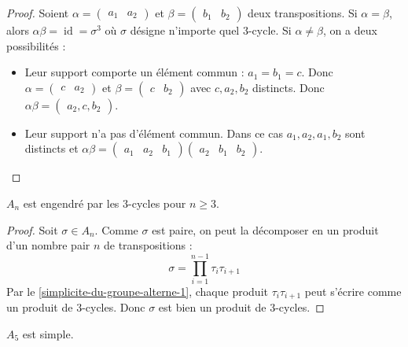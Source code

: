   \begin{proof}
    Soient $\alpha = \begin{pmatrix} a_1 & a_2 \end{pmatrix}$ et $\beta = \begin{pmatrix} b_1 & b_2 \end{pmatrix}$ deux transpositions. Si $\alpha = \beta$, alors $\alpha\beta = \operatorname{id} = \sigma^3$ où $\sigma$ désigne n'importe quel $3$-cycle.
    \newpar
    Si $\alpha \neq \beta$, on a deux possibilités :
    \begin{itemize}
      \item Leur support comporte un élément commun : $a_1 = b_1 = c$. Donc $\alpha = \begin{pmatrix} c & a_2 \end{pmatrix}$ et $\beta = \begin{pmatrix} c & b_2 \end{pmatrix}$ avec $c, a_2, b_2$ distincts. Donc $\alpha\beta = \begin{pmatrix} a_2, c, b_2 \end{pmatrix}$.
      \item Leur support n'a pas d'élément commun. Dans ce cas $a_1, a_2, a_1, b_2$ sont distincts et $\alpha\beta = \begin{pmatrix} a_1 & a_2 & b_1 \end{pmatrix} \begin{pmatrix} a_2 & b_1 & b_2 \end{pmatrix}$.
    \end{itemize}
  \end{proof}

  \begin{lemma}
    \label{simplicite-du-groupe-alterne-3}
    $A_n$ est engendré par les $3$-cycles pour $n \geq 3$.
  \end{lemma}

  \begin{proof}
    Soit $\sigma \in A_n$. Comme $\sigma$ est paire, on peut la décomposer en un produit d'un nombre pair $n$ de transpositions :
    \[ \sigma = \prod_{i=1}^{n-1} \tau_i\tau_{i+1} \]
    Par le \cref{simplicite-du-groupe-alterne-1}, chaque produit $\tau_i\tau_{i+1}$ peut s'écrire comme un produit de $3$-cycles. Donc $\sigma$ est bien un produit de $3$-cycles.
  \end{proof}


  \begin{lemma}
    \label{simplicite-du-groupe-alterne-4}
    $A_5$ est simple.
  \end{lemma}

